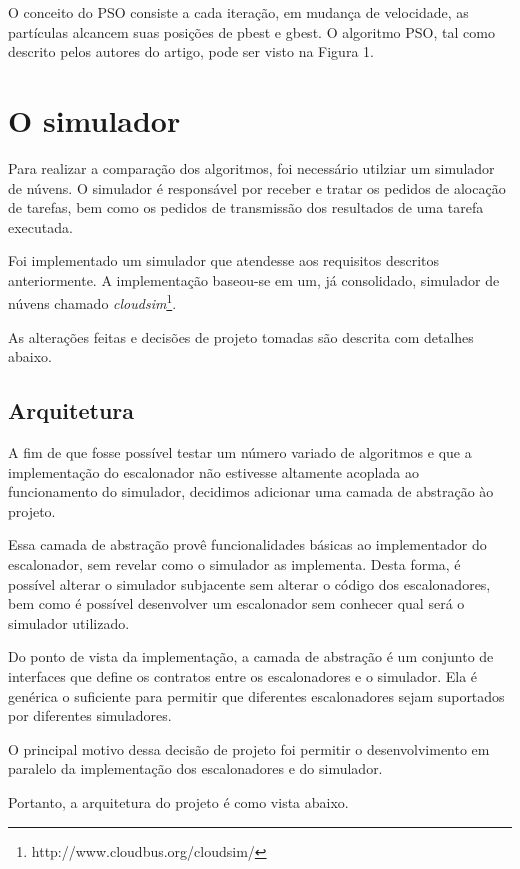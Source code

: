 \documentclass[a4paper,10pt, draft]{article}
\begin{document}
O conceito do PSO consiste a cada iteração, em mudança de velocidade, as partículas 
alcancem suas posições de pbest e gbest. O algoritmo PSO, tal como descrito pelos 
autores do artigo, pode ser visto na Figura 1.

\section{O simulador}

Para realizar a comparação dos algoritmos, foi necessário utilziar um simulador de núvens. O simulador é
responsável por receber e tratar os pedidos de alocação de tarefas, bem como os pedidos de transmissão dos
resultados de uma tarefa executada.

Foi implementado um simulador que atendesse aos requisitos descritos anteriormente. A implementação baseou-se
em um, já consolidado, simulador de núvens chamado \emph{cloudsim}\footnote{http://www.cloudbus.org/cloudsim/}.

As alterações feitas e decisões de projeto tomadas são descrita com detalhes abaixo.

\subsection{Arquitetura}

A fim de que fosse possível testar um número variado de algoritmos e que a implementação do escalonador
não estivesse altamente acoplada ao funcionamento do simulador, decidimos adicionar uma camada de abstração
ào projeto.

Essa camada de abstração provê funcionalidades básicas ao implementador do escalonador, sem revelar como o
simulador as implementa. Desta forma, é possível alterar o simulador subjacente sem alterar o código dos escalonadores,
bem como é possível desenvolver um escalonador sem conhecer qual será o simulador utilizado.

Do ponto de vista da implementação, a camada de abstração é um conjunto de interfaces que define os contratos
entre os escalonadores e o simulador.
Ela é genérica o suficiente para permitir que diferentes escalonadores sejam suportados por diferentes simuladores.

O principal motivo dessa decisão de projeto foi permitir o desenvolvimento em paralelo da implementação dos escalonadores
e do simulador.

Portanto, a arquitetura do projeto é como vista abaixo.
\end{document}
